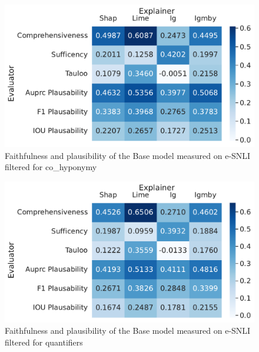 \begin{figure}[h!]
    \centering
    \includegraphics[width=\textwidth]{./images/ferret_heatmaps_phenomena/default_mnli/co_hyponym.pdf}
    \caption{Faithfulness and plausibility of the Base model measured on \acs{e-SNLI} filtered for co_hyponymy}
    \label{fig:ferret-mnli-co-hyponym}
\end{figure}

\begin{figure}[h!]
    \centering
    \includegraphics[width=\textwidth]{./images/ferret_heatmaps_phenomena/default_mnli/quantifiers.pdf}
    \caption{Faithfulness and plausibility of the Base model measured on \acs{e-SNLI} filtered for quantifiers}
    \label{fig:ferret-mnli-quantifiers}
\end{figure}

